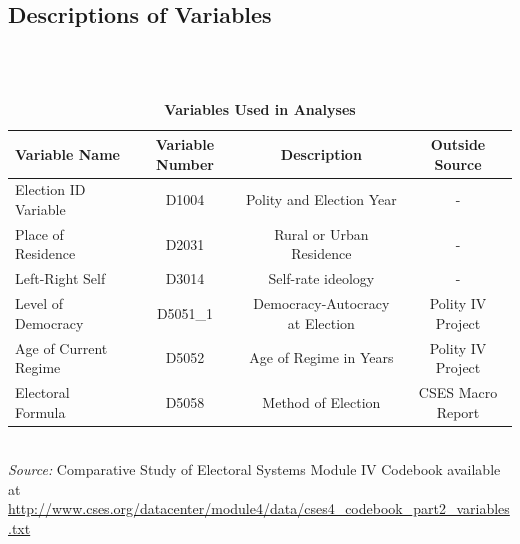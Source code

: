 \documentclass[12pt, titlepage]{article}
\newcommand\e{\emph}
\newcommand\tb{\textbf}
\begin{document}
\begin{appendices}

\begin{landscape}
\section{Descriptions of Variables }
\label{AppendixA}

~~~\\\\

\begin{table}[h!]
	\centering
	\def\arraystretch{1.5}
	\caption{\tb{Variables Used in Analyses}}
	\begin{tabulary}{\linewidth}{l c c c}
		\\
		\hline
		\tb{Variable Name}& \tb{Variable Number} & \tb{Description}&\tb{Outside Source} \\
		\hline
		Election ID Variable &D1004&Polity and Election Year&-\\
		Place of Residence&D2031&Rural or Urban Residence&-\\
		Left-Right Self&D3014&Self-rate ideology &-\\
		Level of Democracy&D5051\_1&Democracy-Autocracy at Election&Polity IV Project\\
		Age of Current Regime&D5052&Age of Regime in Years& Polity IV Project\\
		Electoral Formula&D5058&Method of Election&CSES Macro Report\\
		\hline
	\end{tabulary}\\
	\e{Source:} Comparative Study of Electoral Systems Module IV Codebook available at \url{http://www.cses.org/datacenter/module4/data/cses4_codebook_part2_variables.txt}
	\label{table99}
\end{table}


\end{landscape}
\end{appendices}
\end{document}
